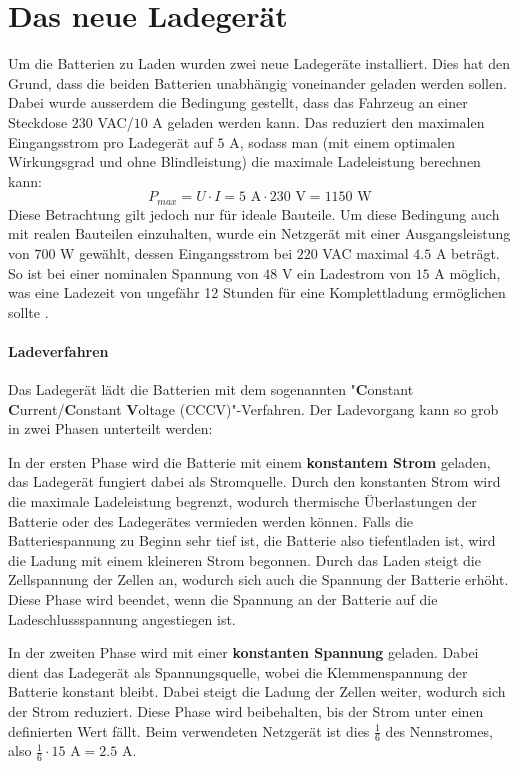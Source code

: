 \section{Das neue Ladegerät}
Um die Batterien zu Laden wurden zwei neue Ladegeräte installiert. Dies hat den Grund, dass die beiden Batterien unabhängig voneinander geladen werden sollen. Dabei wurde ausserdem die Bedingung gestellt, dass das Fahrzeug an einer Steckdose $230$ VAC/$10$ A geladen werden kann. Das reduziert den maximalen Eingangsstrom pro Ladegerät auf $5$ A, sodass man (mit einem optimalen Wirkungsgrad und ohne Blindleistung) die maximale Ladeleistung berechnen kann:
\begin{equation*}
	P_{max}=U\cdot I=5\text{ A}\cdot230\text{ V}=1150\text{ W}
\end{equation*}
Diese Betrachtung gilt jedoch nur für ideale Bauteile. Um diese Bedingung auch mit realen Bauteilen einzuhalten, wurde ein Netzgerät mit einer Ausgangsleistung von $700$ W gewählt, dessen Eingangsstrom bei $220$ VAC maximal $4.5$ A beträgt. So ist bei einer nominalen Spannung von $48$ V ein Ladestrom von $15$ A möglich, was eine Ladezeit von ungefähr 12 Stunden für eine Komplettladung ermöglichen sollte \cite{ladegeraet}.

\paragraph{Ladeverfahren}
Das Ladegerät lädt die Batterien mit dem sogenannten "\textbf{C}onstant \textbf{C}urrent/\textbf{C}onstant \textbf{V}oltage (CCCV)"-Verfahren. Der Ladevorgang kann so grob in zwei Phasen unterteilt werden:

In der ersten Phase wird die Batterie mit einem \textbf{konstantem Strom} geladen, das Ladegerät fungiert dabei als Stromquelle. Durch den konstanten Strom wird die maximale Ladeleistung begrenzt, wodurch thermische Überlastungen der Batterie oder des Ladegerätes vermieden werden können. Falls die Batteriespannung zu Beginn sehr tief ist, die Batterie also tiefentladen ist, wird die Ladung mit einem kleineren Strom begonnen. Durch das Laden steigt die Zellspannung der Zellen an, wodurch sich auch die Spannung der Batterie erhöht. Diese Phase wird beendet, wenn die Spannung an der Batterie auf die Ladeschlussspannung angestiegen ist.

In der zweiten Phase wird mit einer \textbf{konstanten Spannung} geladen. Dabei dient das Ladegerät als Spannungsquelle, wobei die Klemmenspannung der Batterie konstant bleibt. Dabei steigt die Ladung der Zellen weiter, wodurch sich der Strom reduziert. Diese Phase wird beibehalten, bis der Strom unter einen definierten Wert fällt. Beim verwendeten Netzgerät ist dies $\frac{1}{6}$ des Nennstromes, also $\frac{1}{6}\cdot 15\text{ A}=2.5\text{ A}$.

